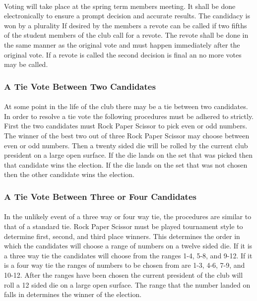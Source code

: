 \documentclass[12pt]{article}
\begin{document}
\paragraph{}
Voting will take place at the spring term members meeting. 
It shall be done electronically to ensure a prompt decision and accurate results. 
The candidacy is won by a plurality
If desired by the members a revote can be called if two fifths of the student members of the club call for a revote. 
The revote shall be done in the same manner as the original vote and must happen immediately after
the original vote.
If a revote is called the second decision is final an no more votes may be called. 

\subsubsection{A Tie Vote Between Two Candidates}
\paragraph{}
At some point in the life of the club there may be a tie between two candidates. In order to resolve a tie vote the following procedures must be adhered to strictly. First the two candidates must Rock Paper Scissor to pick even or odd numbers. The winner of the best two out of three Rock Paper Scissor may choose between even or odd numbers. Then a twenty sided die will be rolled by the current club president on a large open surface. If the die lands on the set that was picked then that candidate wins the election. If the die lands on the set that was not chosen then the other candidate wins the election.

\subsubsection {A Tie Vote Between Three or Four Candidates}
\paragraph{}
In the unlikely event of a three way or four way tie, the procedures are similar to that of a standard tie. Rock Paper Scissor must be played tournament style to determine first, second, and third place winners. This determines the order in which the candidates will choose a range of numbers on a twelve sided die. If it is a three way tie the candidates will choose from the ranges 1-4, 5-8, and 9-12. If it is a four way tie the ranges of numbers to be chosen from are 1-3, 4-6, 7-9, and 10-12. After the ranges have been chosen the current president of the club will roll a 12 sided die on a large open surface. The range that the number landed on falls in determines the winner of the election.
\end{document}
